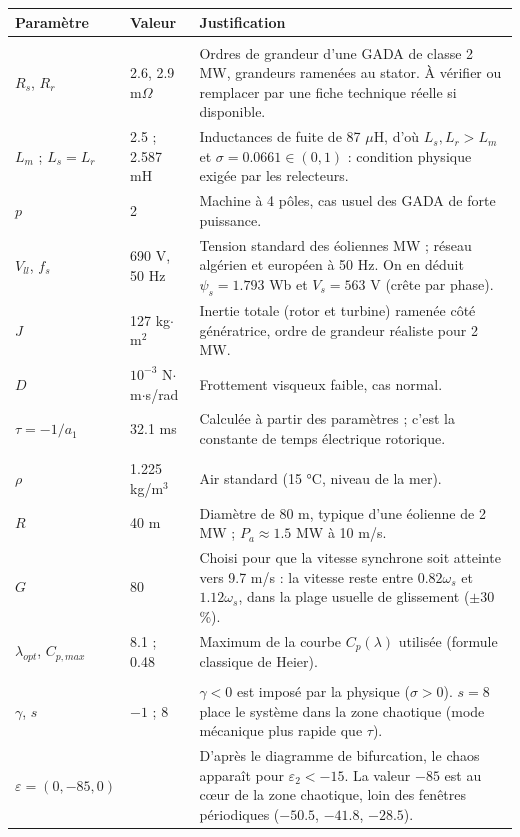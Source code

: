 \documentclass[11pt,a4paper]{article}
\begin{document}
\small
\begin{longtable}{>{\raggedright}p{3.3cm}p{2.3cm}p{9.6cm}}
\toprule
Paramètre & Valeur & Justification\\
\midrule
\endhead
\multicolumn{3}{l}{\textbf{Génératrice (tableau I)}}\\
$R_s$, $R_r$ & 2.6, 2.9 m$\Omega$ & Ordres de grandeur d'une GADA de classe 2 MW, grandeurs ramenées au stator. À vérifier ou remplacer par une fiche technique réelle si disponible.\\
$L_m$ ; $L_s=L_r$ & 2.5 ; 2.587 mH & Inductances de fuite de 87 $\mu$H, d'où $L_s,L_r>L_m$ et $\sigma=0.0661\in(0,1)$ : condition physique exigée par les relecteurs.\\
$p$ & 2 & Machine à 4 pôles, cas usuel des GADA de forte puissance.\\
$V_{ll}$, $f_s$ & 690 V, 50 Hz & Tension standard des éoliennes MW ; réseau algérien et européen à 50 Hz. On en déduit $\psi_s=1.793$ Wb et $V_s=563$ V (crête par phase).\\
$J$ & 127 kg$\cdot$m$^2$ & Inertie totale (rotor et turbine) ramenée côté génératrice, ordre de grandeur réaliste pour 2 MW.\\
$D$ & $10^{-3}$ N$\cdot$m$\cdot$s/rad & Frottement visqueux faible, cas normal.\\
$\tau=-1/a_1$ & 32.1 ms & Calculée à partir des paramètres ; c'est la constante de temps électrique rotorique.\\
\midrule
\multicolumn{3}{l}{\textbf{Turbine}}\\
$\rho$ & 1.225 kg/m$^3$ & Air standard (15 °C, niveau de la mer).\\
$R$ & 40 m & Diamètre de 80 m, typique d'une éolienne de 2 MW ; $P_a\approx1.5$ MW à 10 m/s.\\
$G$ & 80 & Choisi pour que la vitesse synchrone soit atteinte vers 9.7 m/s : la vitesse reste entre $0.82\omega_s$ et $1.12\omega_s$, dans la plage usuelle de glissement ($\pm30$ \%).\\
$\lambda_{opt}$, $C_{p,max}$ & 8.1 ; 0.48 & Maximum de la courbe $C_p(\lambda)$ utilisée (formule classique de Heier).\\
\midrule
\multicolumn{3}{l}{\textbf{Chaos (modèle adimensionnel)}}\\
$\gamma$, $s$ & $-1$ ; 8 & $\gamma<0$ est imposé par la physique ($\sigma>0$). $s=8$ place le système dans la zone chaotique (mode mécanique plus rapide que $\tau$).\\
$\varepsilon=(0,-85,0)$ & & D'après le diagramme de bifurcation, le chaos apparaît pour $\varepsilon_2<-15$. La valeur $-85$ est au cœur de la zone chaotique, loin des fenêtres périodiques ($-50.5$, $-41.8$, $-28.5$).\\

\end{longtable}
\end{document}
